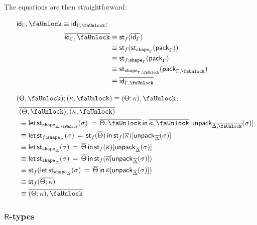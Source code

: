 \documentclass[10pt]{article}
\theoremstyle{definition}
\newcommand{\id}{\mathsf{id}}
\newcommand\StI[2]{\ensuremath{\mathsf{st}_{#1}(#2)}}
\newcommand\StE[4]{\ensuremath{\mathsf{let} \, \StI{#1}{#3} \, = \, {#2} \, \mathsf{in} \, #4}}
\newcommand\pack[1]{\ensuremath{\mathsf{pack}_{#1}}}
\newcommand\unpack[2]{\ensuremath{\mathsf{unpack}_{#1}(#2)}}
\newcommand{\tshape}[1]{\ensuremath{\mathtt{shape}_{#1}}}
\newcommand{\upstairs}[1]{\overline{#1}}
\newcommand{\lock}{\text{\faUnlock}}
\begin{document}
The equations are then straightforward:
\begin{enumerate}[style = multiline, labelwidth = 80pt]
\item[{$\id_\Gamma , \lock \equiv \id_{\Gamma, \lock}$}:]
\begin{align*}
\upstairs{\id_\Gamma , \lock}
&\equiv \StI{f}{\upstairs{\id_\Gamma}} \\
&\equiv \StI{f}{\StI{\tshape{\Gamma}}{\pack{\Gamma}}} \\
&\equiv \StI{f;\tshape{\Gamma}}{\pack{\Gamma}} \\
&\equiv \StI{\tshape{\Gamma, \lock}}{\pack{\Gamma, \lock}} \\
&\equiv \upstairs{\id_{\Gamma, \lock}}
\end{align*}

\item[{$(\Theta, \lock) ; (\kappa, \lock) \equiv (\Theta ; \kappa), \lock$}:] 
\begin{align*}
&\upstairs{(\Theta, \lock) ; (\kappa, \lock)} \\
&\equiv \StE{\tshape{\Delta, \lock}}{\upstairs{\Theta, \lock}}{\sigma}{\upstairs{\kappa, \lock}[\unpack{\upstairs{\Delta, \lock}}{\sigma}]} \\
&\equiv \StE{f;\tshape{\Delta}}{\StI{f}{\upstairs{\Theta}}}{\sigma}{\StI{f}{\upstairs{\kappa}}[\unpack{\upstairs{\Delta}}{\sigma}]} \\
&\equiv \StE{\tshape{\Delta}}{\upstairs{\Theta}}{\sigma}{\StI{f}{\upstairs{\kappa}}[\unpack{\upstairs{\Delta}}{\sigma}]} \\
&\equiv \StE{\tshape{\Delta}}{\upstairs{\Theta}}{\sigma}{\StI{f}{\upstairs{\kappa}[\unpack{\upstairs{\Delta}}{\sigma}]}} \\
&\equiv \StI{f}{\StE{\tshape{\Delta}}{\upstairs{\Theta}}{\sigma}{\upstairs{\kappa}[\unpack{\upstairs{\Delta}}{\sigma}]}} \\
&\equiv \StI{f}{\upstairs{\Theta ; \kappa}} \\
&\equiv \upstairs{(\Theta ; \kappa), \lock}
\end{align*}
\end{enumerate}

\subsubsection{$\mathsf{R}$-types}
\end{document}

